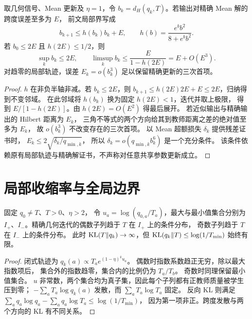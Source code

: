 \begin{proposition}
\label{prop:mean-noise-floor}
取几何信号、Mean 更新及 $\eta=1$，令
$b_k=d_H(q_k,T)$。若输出对精确 Mean 解的跨度误差至多为 $E$，
前文局部界写成
\begin{equation}
b_{k+1}\le h(b_k)b_k+E,\qquad
h(b)=\frac{e^bb^2}{8+e^bb^2}.
\end{equation}
若 $b_0\le2E$ 且 $h(2E)\le1/2$，则
\begin{equation}
\sup_k b_k\le2E,\qquad
\limsup_k b_k\le\frac{E}{1-h(2E)}=E+O(E^3).
\end{equation}
对趋零的局部轨迹，误差 $E_k=o(b_k^3)$ 足以保留精确更新的三次首项。
\end{proposition}
\begin{proof}
$h$ 在非负半轴非减。若 $b_k\le2E$，则
$b_{k+1}\le h(2E)2E+E\le2E$，归纳得到不变邻域。
在此邻域将 $h(b_k)$ 换为固定 $h(2E)<1$，迭代并取上极限，
得到 $E/[1-h(2E)]$。由 $h(2E)=O(E^2)$ 得最后展开。
若近似输出与精确输出的 Hilbert 距离为 $E_k$，
三角不等式的两个方向给其到教师距离之差的绝对值至多为 $E_k$，
故 $o(b_k^3)$ 不改变存在的三次首项。
以 Mean 超额损失 $\delta_k$ 提供残差证书时，
$E_k\le2\sqrt{\delta_k/q_{\min,k}}$，
所以 $\delta_k=o(q_{\min,k}b_k^6)$ 是一个充分条件。
该条件依赖原有局部轨迹与精确解证书，不声称对任意共享参数更新成立。
\end{proof}

\section{局部收缩率与全局边界}
\begin{proposition}[几何更新在稳定区间之外的两个极限]
\label{prop:geometric-unstable-limit}
固定 $q_0\ne T$、$T>0$、$\eta>2$，
令 $u_a=\log(q_{0,a}/T_a)$，最大与最小值集合分别为
$I_+$、$I_-$。精确几何迭代的偶数子列趋于 $T$ 在 $I_+$ 上的条件分布，
奇数子列趋于 $T$ 在 $I_-$ 上的条件分布。
此时 $\operatorname{KL}(T\Vert q_k)\to\infty$，但
$\operatorname{KL}(q_k\Vert T)\le\log(1/T_{\min})$ 始终有限。
\end{proposition}
\begin{proof}
闭式轨迹为 $q_k(a)\propto T_ae^{(1-\eta)^ku_a}$。
偶数时指数系数趋正无穷，除以最大指数项后，
集合外的指数趋零，集合内的比例仍为 $T_a/T_b$。
奇数时同理保留最小值集合。
$u$ 非常数，两个集合均为真子集，因此每个子列都有正教师质量被学生压到零；
$-\sum_aT_a\log q_k(a)$ 发散，而 $\sum_aT_a\log T_a$ 固定。
反向 KL 则满足
$\sum_aq_a\log q_a-\sum_aq_a\log T_a\le\log(1/T_{\min})$，
因为第一项非正。跨度发散与两个方向的 KL 有不同关系。
\end{proof}

